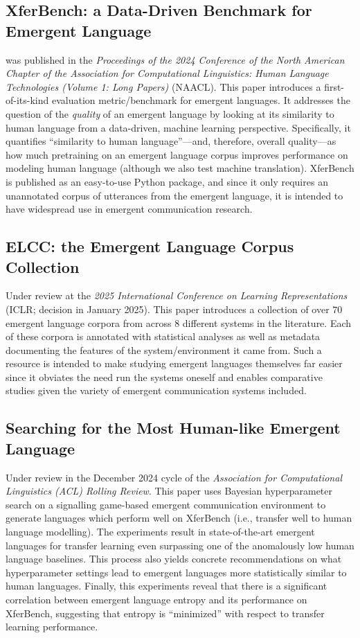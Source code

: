 \subsection{XferBench: a Data-Driven Benchmark for Emergent Language}
\noindent
\citet{boldt2024xferbench} was published in the \textit{Proceedings of the 2024 Conference of the North American Chapter of the Association for Computational Linguistics: Human Language Technologies (Volume 1: Long Papers)} (NAACL).
This paper introduces a first-of-its-kind evaluation metric/benchmark for emergent languages.
It addresses the question of the \emph{quality} of an emergent language by looking at its similarity to human language from a data-driven, machine learning perspective.
Specifically, it quantifies ``similarity to human language''---and, therefore, overall quality---as how much pretraining on an emergent language corpus improves performance on modeling human language (although we also test machine translation).
XferBench is published as an easy-to-use Python package, and since it only requires an unannotated corpus of utterances from the emergent language, it is intended to have widespread use in emergent communication research.


\subsection{ELCC: the Emergent Language Corpus Collection}
Under review at the \textit{2025 International Conference on Learning Representations} (ICLR; decision in January 2025).
This paper introduces a collection of over $70$ emergent language corpora from across $8$ different systems in the literature.
Each of these corpora is annotated with statistical analyses as well as metadata documenting the features of the system/environment it came from.
Such a resource is intended to make studying emergent languages themselves far easier since it obviates the need run the systems oneself and enables comparative studies given the variety of emergent communication systems included.

\subsection{Searching for the Most Human-like Emergent Language}
Under review in the December 2024 cycle of the \emph{Association for Computational Linguistics (ACL) Rolling Review}.
This paper uses Bayesian hyperparameter search on a signalling game-based emergent communication environment to generate languages which perform well on XferBench (i.e., transfer well to human language modelling).
The experiments result in state-of-the-art emergent languages for transfer learning even surpassing one of the anomalously low human language baselines.
This process also yields concrete recommendations on what hyperparameter settings lead to emergent languages more statistically similar to human languages.
Finally, this experiments reveal that there is a significant correlation between emergent language entropy and its performance on XferBench, suggesting that entropy is ``minimized'' with respect to transfer learning performance.


